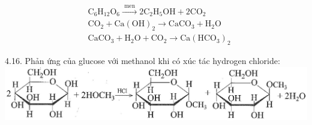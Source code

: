 \documentclass[10pt]{article}
\begin{document}
$$
\begin{aligned}
& \mathrm{C}_{6} \mathrm{H}_{12} \mathrm{O}_{6} \xrightarrow{\text { men }} 2 \mathrm{C}_{2} \mathrm{H}_{5} \mathrm{OH}+2 \mathrm{CO}_{2} \\
& \mathrm{CO}_{2}+\mathrm{Ca}(\mathrm{OH})_{2} \rightarrow \mathrm{CaCO}_{3}+\mathrm{H}_{2} \mathrm{O} \\
& \mathrm{CaCO}_{3}+\mathrm{H}_{2} \mathrm{O}+\mathrm{CO}_{2} \rightarrow \mathrm{Ca}\left(\mathrm{HCO}_{3}\right)_{2}
\end{aligned}
$$

4.16. Phản ứng của glucose với methanol khi có xúc tác hydrogen chloride:\\
\includegraphics[max width=\textwidth, center]{2025_10_23_3f52bbaab6caa9e2ff75g-04}
\end{document}
